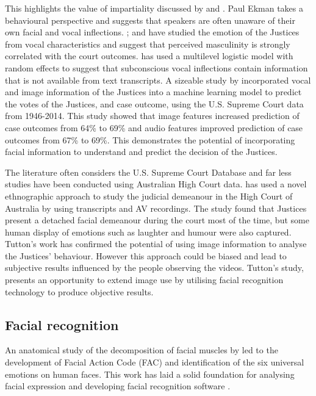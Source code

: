\documentclass{monashthesis}
\begin{document}
This highlights the value of impartiality discussed by \textcite{tutton2018judicial} and \textcite{goffman1956nature}.
Paul Ekman \textcite{ekman1991invited} takes a behavioural perspective and suggests that speakers are often unaware of their own facial and vocal inflections. \textcite{chen2016perceived}; \textcite{chen2017covering} and \textcite{schubert1992observing} have studied the emotion of the Justices from vocal characteristics and suggest that perceived masculinity is strongly correlated with the court outcomes. \textcite{dietrich2019emotional} has used a multilevel logistic model with random effects to suggest that subconscious vocal inflections contain information that is not available from text transcripts.
A sizeable study by \textcite{chen2018justice} incorporated vocal and image information of the Justices into a machine learning model to predict the votes of the Justices, and case outcome, using the U.S. Supreme Court data from 1946-2014. This study showed that image features increased prediction of case outcomes from 64\% to 69\% and audio features improved prediction of case outcomes from 67\% to 69\%. This demonstrates the potential of incorporating facial information to understand and predict the decision of the Justices.

The literature often considers the U.S. Supreme Court Database and far less studies have been conducted using Australian High Court data. \textcite{tutton2018judicial} has used a novel ethnographic approach to study the judicial demeanour in the High Court of Australia by using transcripts and AV recordings. The study found that Justices present a detached facial demeanour during the court most of the time, but some human display of emotions such as laughter and humour were also captured. Tutton's \autocite*{tutton2018judicial} work has confirmed the potential of using image information to analyse the Justices' behaviour. However this approach could be biased and lead to subjective results influenced by the people observing the videos. Tutton's \autocite*{tutton2018judicial} study, presents an opportunity to extend image use by utilising facial recognition technology to produce objective results.

\hypertarget{facial-recognition}{%
\subsection{Facial recognition}\label{facial-recognition}}

An anatomical study of the decomposition of facial muscles by \textcite{ekman1976measuring} led to the development of Facial Action Code (FAC) and identification of the six universal emotions on human faces. This work has laid a solid foundation for analysing facial expression and developing facial recognition software \autocites{huang1997}{Tong2007}.
\end{document}
